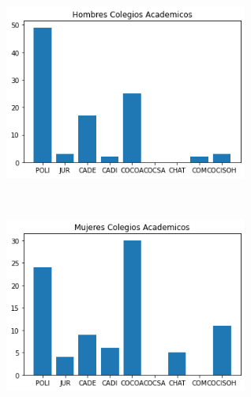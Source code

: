 \documentclass{article}
\begin{document}
\includegraphics[width=8cm, height=7cm]{bar_colegios_hombres}
\includegraphics[width=8cm, height=7cm]{bar_colegios_mujeres}
\end{document}
